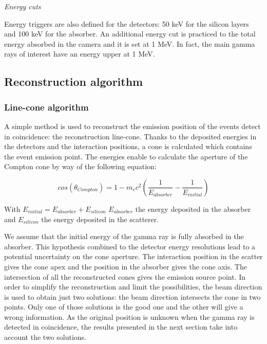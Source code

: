 \textit{Energy cuts}\newline

Energy triggers are also defined for the detectors: 50 keV for the silicon layers and 100 keV for the absorber. An additional energy cut is practiced to the total energy absorbed in the camera and it is set at 1 MeV. In fact, the main gamma rays of interest have an energy upper at 1 MeV.

\subsection{Reconstruction algorithm}

\subsubsection{Line-cone algorithm}
A simple method is used to reconstruct the emission position of the events detect in coincidence: the reconstruction line-cone. Thanks to the deposited energies in the detectors and the interaction positions, a cone is calculated which contains the event emission point. The energies enable to calculate the aperture of the Compton cone by way of the following equation:

\begin{equation}
cos(\theta_{Compton}) = 1-m_ec^2\left(\frac{1}{E_{absorber}}-\frac{1}{E_{initial}}\right)
\end{equation}

	
With $E_{initial} = E_{absorber} + E_{silicon}$\newline
$E_{absorber}$ the energy deposited in the absorber and $E_{silicon}$ the energy deposited in the scatterer.\newline

We assume that the initial energy of the gamma ray is fully absorbed in the absorber. This hypothesis combined to the detector energy resolutions lead to a potential uncertainty on the cone aperture. The interaction position in the scatter gives the cone apex and the position in the absorber gives the cone axis. The intersection of all the reconstructed cones gives the emission source point. In order to simplify the reconstruction and limit the possibilities, the beam direction is used to obtain just two solutions: the beam direction intersects the cone in two points. Only one of those solutions is the good one and the other will give a wrong information. As the original position is unknown when the gamma ray is detected in coincidence, the results presented in the next section take into account the two solutions.\newline

